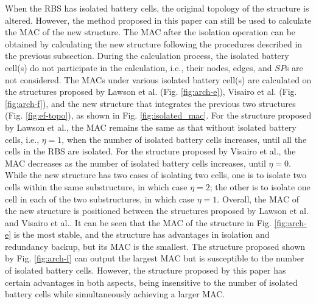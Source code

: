 \documentclass{article}
\begin{document}

When the RBS has isolated battery cells, the original topology of the structure is altered. 
However, the method proposed in this paper can still be used to calculate the MAC of the new structure. 
The MAC after the isolation operation can be obtained by calculating the new structure following the procedures described in the previous subsection.
During the calculation process, the isolated battery cell(s) do not participate in the calculation, i.e., their nodes, edges, and $SP$s are not considered. 
The MACs under various isolated battery cell(s) are calculated on the structures proposed by Lawson et al. (Fig. \ref{fig:arch-e}), Visairo et al. (Fig. \ref{fig:arch-f}), and the new structure that integrates the previous two structures (Fig. \ref{fig:ef-topo}), as shown in Fig. \ref{fig:isolated_mac}. 
For the structure proposed by Lawson et al., the MAC remains the same as that without isolated battery cells, i.e., $\eta=1$, when the number of isolated battery cells increases, until all the cells in the RBS are isolated.
For the structure proposed by Visairo et al., the MAC decreases as the number of isolated battery cells increases, until $\eta=0$.
While the new structure has two cases of isolating two cells, one is to isolate two cells within the same substructure, in which case $\eta=2$; the other is to isolate one cell in each of the two substructures, in which case $\eta=1$. 
Overall, the MAC of the new structure is positioned between the structures proposed by Lawson et al. and Visairo et al..
It can be seen that the MAC of the structure in Fig. \ref{fig:arch-e} is the most stable, and the structure has advantages in isolation and redundancy backup, but its MAC is the smallest. 
The structure proposed shown by Fig. \ref{fig:arch-f} can output the largest MAC but is susceptible to the number of isolated battery cells. 
However, the structure proposed by this paper has certain advantages in both aspects, being insensitive to the number of isolated battery cells while simultaneously achieving a larger MAC.
\end{document}
